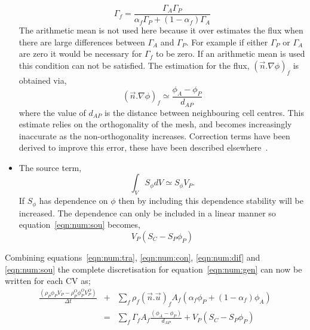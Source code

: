 \begin{itemize}
\begin{equation}
\Gamma_f = \frac{\Gamma_A\Gamma_P}{\alpha_f \Gamma_P + (1-\alpha_f) \Gamma_A}
\end{equation}
The arithmetic mean is not used here because it over estimates the flux
when there are large differences between $\Gamma_A$ and $\Gamma_P$.
For example if either $\Gamma_P$ or $\Gamma_A$ are zero it
would be necessary for $\Gamma_f$ to be zero. If an arithmetic mean
is used this condition can not be satisfied.
The estimation for the flux, $(\vec{n}.\nabla\phi)_f$ is obtained via,
\begin{equation}
(\vec{n}.\nabla\phi)_f \simeq \frac{\phi_A-\phi_P}{d_{AP}}
\end{equation}
where the value of $d_{AP}$ is the distance between neighbouring cell centres.
This estimate relies on the orthogonality of the mesh, and becomes
increasingly inaccurate as the non-orthogonality increases. Correction terms
have been derived to improve this error, these have been described
elsewhere~\cite{croftphd}.
%
%
%
\item The source term, 
\begin{equation}
\int_V S_{\phi} dV \simeq S_\phi V_P.
\label{eqn:num:sou}
\end{equation}
If $S_\phi$ has dependence on $\phi$ then by including this dependence
stability will be increased. The dependence can only be included in
a linear manner so equation~\eqref{eqn:num:sou} becomes,
\begin{equation}
V_P (S_C - S_P \phi_P)
\end{equation}
\end{itemize}

Combining equations~\eqref{eqn:num:tra}, \eqref{eqn:num:con}, \eqref{eqn:num:dif} and
\eqref{eqn:num:sou} the complete discretisation for equation~\eqref{eqn:num:gen}
can now be written for each CV as;
\begin{eqnarray}
\frac{(\rho_{P} \phi_{P} V_P- \rho_P^O \phi_P^O V_P^O)}{\Delta t}
&+&
\sum_{f} \rho_f (\vec{n}.\vec{u})_f A_f (\alpha_f \phi_P +(1-\alpha_f)\phi_A)
\\
&=&
\sum_f \Gamma_f A_f \frac{(\phi_A-\phi_P)}{d_{AP}}
+ 
V_P ( S_C - S_P \phi_P )
\label{eqn:num:dis}
\end{eqnarray}

